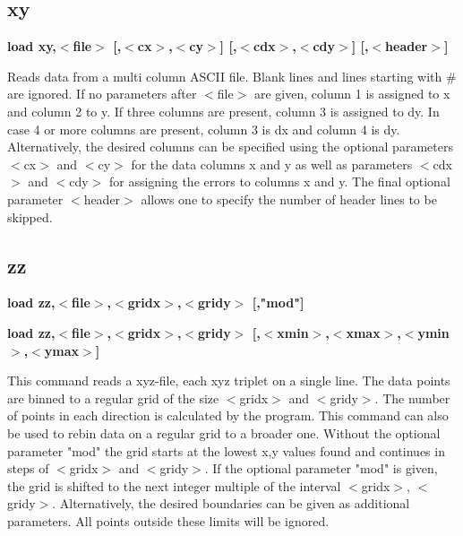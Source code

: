 \subsection*{xy}
{\bf load xy,$ <$file$> $ [,$ <$cx$> $,$ <$cy$> $] [,$ <$cdx$> $,$ <$cdy$> $] [,$ <$header$> $] \par }
\par
\vspace{3pt}
Reads data from a multi column ASCII file. Blank lines and lines 
starting with \# are ignored. If no parameters after $ <$file$> $ are given, 
column 1 is assigned to x and column 2 to y. If three columns are 
present, column 3 is assigned to dy. In case 4 or more columns are 
present, column 3 is dx and column 4 is dy. Alternatively, the 
desired columns can be specified using the optional parameters 
$ <$cx$> $ and $ <$cy$> $ for the data columns x and y as well as parameters 
$ <$cdx$> $ and $ <$cdy$> $ for assigning the errors to columns x and y. The 
final optional parameter $ <$header$> $ allows one to specify the number 
of header lines to be skipped. 
\subsection*{zz}
{\bf load zz,$ <$file$> $,$ <$gridx$> $,$ <$gridy$> $ [,"mod"] \par }
{\bf load zz,$ <$file$> $,$ <$gridx$> $,$ <$gridy$> $ [,$ <$xmin$> $,$ <$xmax$> $,$ <$ymin$> $,$ <$ymax$> $] \par }
\par
\vspace{3pt}
This command reads a xyz-file, each xyz triplet on a single line. 
The data points are binned to a regular grid of the size $ <$gridx$> $ 
and $ <$gridy$> $. The number of points in each direction is calculated 
by the program. This command can also be used to rebin data on 
a regular grid to a broader one. 
Without the optional parameter "mod" the grid starts at the lowest 
x,y values found and continues in steps of $ <$gridx$> $ and $ <$gridy$> $. 
If the optional parameter "mod" is given, the grid is shifted 
to the next integer multiple of the interval $ <$gridx$> $, $ <$gridy$> $. 
Alternatively, the desired boundaries can be given as additional 
parameters. All points outside these limits will be ignored. 
